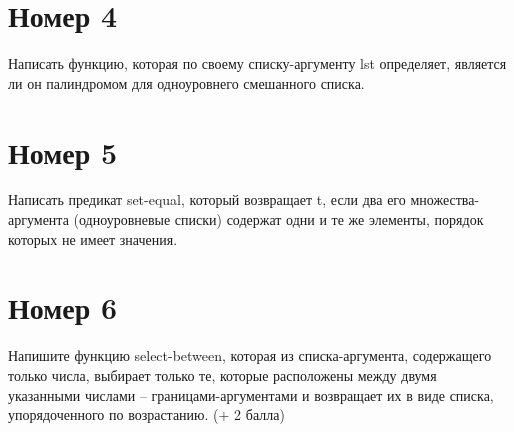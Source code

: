 \begin{figure}[H]
    \begin{listingbox}{}
        
    \end{listingbox}
    \label{lst:3}
\end{figure}

\section{Номер 4}

Написать функцию, которая по своему списку-аргументу lst определяет, является
ли он палиндромом для одноуровнего смешанного списка.

\begin{figure}[H]
    \begin{listingbox}{}
        
    \end{listingbox}
    \label{lst:4}
\end{figure}

\section{Номер 5}

Написать предикат set-equal, который возвращает t, если два его множества-аргумента
(одноуровневые списки) содержат одни и те же элементы, порядок которых не имеет 
значения.

\begin{figure}[H]
    \begin{listingbox}{}
        
    \end{listingbox}
    \label{lst:5}
\end{figure}

\section{Номер 6}

Напишите функцию select-between, которая из списка-аргумента, содержащего
только числа, выбирает только те, которые расположены между двумя указанными числами
-- границами-аргументами и возвращает их в виде списка, упорядоченного по возрастанию.
(+ 2 балла)

\begin{figure}[H]
    \begin{listingbox}{}
        
    \end{listingbox}
    \label{lst:6}
\end{figure}

